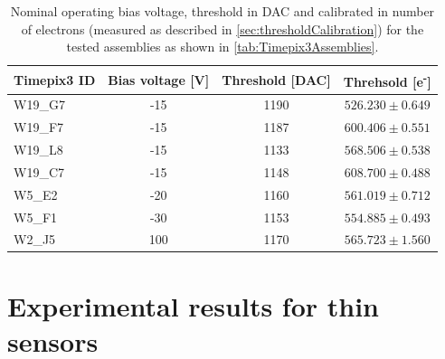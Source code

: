 \begin{table}[htbp]
  \centering
  \caption{Nominal operating bias voltage, threshold in DAC and
    calibrated in number of electrons (measured as described in
    \cref{sec:thresholdCalibration}) for the tested assemblies as
    shown in \cref{tab:Timepix3Assemblies}.}
  \label{tab:nominalBiasThreshold}
  \begin{tabular}{lccc}
    \toprule
    Timepix3 ID & Bias voltage [V] & Threshold [DAC] & Threhsold [e\textsuperscript{-}]\\
    \midrule
    W19\_G7 & -15 & 1190 & $526.230\pm0.649$ \\
    W19\_F7 & -15 & 1187 & $600.406\pm0.551$ \\
    W19\_L8 & -15 & 1133 & $568.506\pm0.538$ \\
    W19\_C7 & -15 & 1148 & $608.700\pm0.488$ \\ \hline
    W5\_E2 & -20 & 1160 & $561.019\pm0.712$ \\ \hline
    W5\_F1 & -30 & 1153 & $554.885\pm0.493$ \\ \hline
    W2\_J5 & 100 & 1170 & $565.723\pm1.560$ \\
    \bottomrule
  \end{tabular}
\end{table}




\section{Experimental results for thin sensors}

